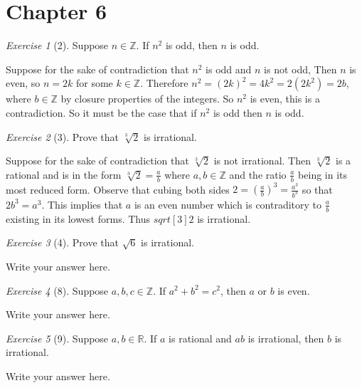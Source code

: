 \documentclass[12pt]{amsart}
\makeatletter
\theoremstyle{remark}
\newtheorem*{exercise}{Exercise}%
\def\RR{\ensuremath{\mathbb R}}
\def\ZZ{\ensuremath{\mathbb Z}}
\renewenvironment{proof}[1][\proofname]{\par\doublespacing
  \pushQED{\qed}%
  \normalfont \topsep6\p@\@plus6\p@\relax
  \list{}{%
    \settowidth{\leftmargin}{\itshape\proofname:\hskip\labelsep}%
    \setlength{\labelwidth}{0pt}%
    \setlength{\itemindent}{-\leftmargin}%
  }%
  \item[\hskip\labelsep\itshape#1\@addpunct{:}]\ignorespaces
}{%
  \popQED\endlist\@endpefalse
  \singlespacing
}
\theoremstyle{mycomment}
\makeatother
\begin{document}
\thispagestyle{fancy}

\section*{Chapter 6}
\begin{exercise}[2] Suppose $n\in\ZZ$. If $n^{2}$ is odd, then $n$ is odd.
\begin{proof}
  Suppose for the sake of contradiction that $n^2$ is odd and $n$ is not odd, Then $n$ is even, so $n = 2k$ for some $k\in\ZZ$. Therefore $n^2 = (2k)^2 = 4k^2 = 2(2k^2) = 2b$, where $b\in\ZZ$ by closure properties of the integers. So $n^2$ is even, this is a contradiction. So it must be the case that if $n^2$ is odd then $n$ is odd. 
\end{proof}
\end{exercise}

\begin{exercise}[3] Prove that $\sqrt[3]{2}$ is irrational.
\begin{proof}
  Suppose for the sake of contradiction that $\sqrt[3]{2}$ is not irrational. Then $\sqrt[3]{2}$ is a rational and is in the form $\sqrt[3]{2} = \frac{a}{b}$ where $a,b\in\ZZ$ and the ratio $\frac{a}{b}$ being in its most reduced form. Observe that cubing both sides $2 = (\frac{a}{b})^3 = \frac{a^3}{b^3}$ so that $2b^3 = a^3$. This implies that $a$ is an even number which is contraditory to $\frac{a}{b}$ existing in its lowest forms. Thus $sqrt[3]{2}$ is irrational.
\end{proof}
\end{exercise}

\begin{exercise}[4] Prove that $\sqrt{6}$ is irrational.
\begin{proof}
Write your answer here.
\end{proof}
\end{exercise}

\begin{exercise}[8] Suppose $a,b,c\in\ZZ$. If $a^{2}+b^{2}=c^{2}$, then $a$ or $b$ is even.
\begin{proof}
Write your answer here.
\end{proof}
\end{exercise}

\begin{exercise}[9] Suppose $a,b\in\RR$. If $a$ is rational and $ab$ is irrational, then $b$ is irrational.
\begin{proof}
Write your answer here.
\end{proof}
\end{exercise}
\end{document}
